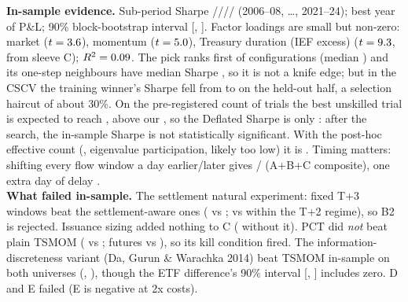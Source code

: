 \documentclass[11pt]{article}
\begin{document}
\textbf{In-sample evidence.} Sub-period Sharpe \suba/\subb/\subc/\subd/\sube{} (2006--08, \ldots, 2021--24); best year \bestyr{} of P\&L; 90\% block-bootstrap interval [\bootlo, \boothi]. Factor loadings are small but non-zero: market \ISmktbeta{} ($t=3.6$), momentum \ISmombeta{} ($t=5.0$), Treasury duration (IEF excess) \ISbondbeta{} ($t=9.3$, from sleeve C); $R^2=0.09$. The pick ranks first of \nconfigs{} configurations (median \cfgmedian) and its one-step neighbours have median Sharpe \nbrmed, so it is not a knife edge; but in the CSCV the training winner's Sharpe fell from \cscvIS{} to \cscvOOS{} on the held-out half, a selection haircut of about 30\%. On the pre-registered count of \ntrials{} trials the best unskilled trial is expected to reach \SRzero, above our \ISsr, so the Deflated Sharpe is only \DSR: after the search, the in-sample Sharpe is not statistically significant. With the post-hoc effective count (\neff, eigenvalue participation, likely too low) it is \DSReff. Timing matters: shifting every flow window a day earlier/later gives \IFCshiftE/\IFCshiftL{} (A+B+C composite), one extra day of delay \IFCdelay.\\
\textbf{What failed in-sample.} The settlement natural experiment: fixed T+3 windows beat the settlement-aware ones (\Bfixed{} vs \isB; \BtwoFixed{} vs \BtwoBase{} within the T+2 regime), so B2 is rejected. Issuance sizing added nothing to C (\Cq{} without it). PCT did \emph{not} beat plain TSMOM (\isP{} vs \isT; futures \PCTFsr{} vs \TSMOMFsr), so its kill condition fired. The information-discreteness variant (Da, Gurun \& Warachka 2014) beat TSMOM in-sample on both universes (\isI, \IDFsr), though the ETF difference's 90\% interval [\IDcilo, \IDcihi] includes zero. D and E failed (E is negative at 2x costs).\\
\end{document}
